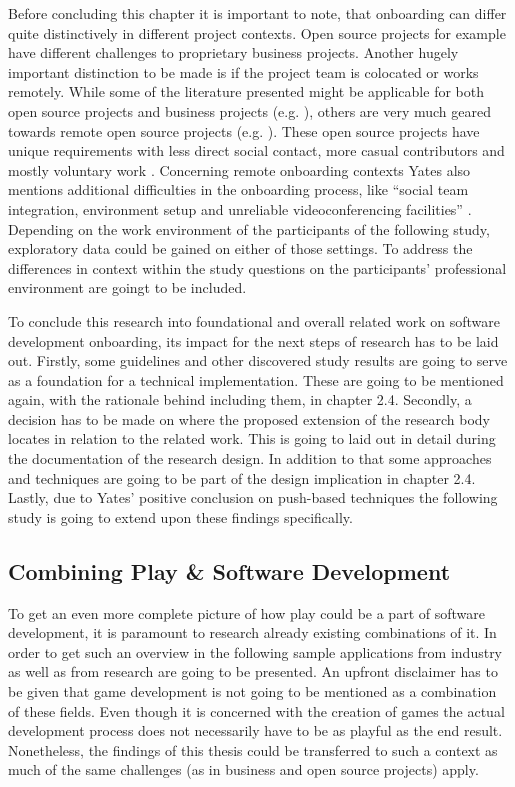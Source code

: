 Before concluding this chapter it is important to note, that onboarding can differ quite distinctively in different project contexts. Open source projects for example have different challenges to proprietary business projects. Another hugely important distinction to be made is if the project team is colocated or works remotely. While some of the literature presented might be applicable for both open source projects and business projects (e.g. \cite{dagenais2010moving}), others are very much geared towards remote open source projects (e.g. \cite{steinmacher2018let}). These open source projects have unique requirements with less direct social contact, more casual contributors and mostly voluntary work \cite{steinmacher2018let}. Concerning remote onboarding contexts Yates also mentions additional difficulties in the onboarding process, like \enquote{social team integration, environment setup and unreliable videoconferencing facilities} \cite[p. 35]{yates2014onboarding}. Depending on the work environment of the participants of the following study, exploratory data could be gained on either of those settings. To address the differences in context within the study questions on the participants' professional environment are goingt to be included.

To conclude this research into foundational and overall related work on software development onboarding, its impact for the next steps of research has to be laid out. Firstly, some guidelines and other discovered study results are going to serve as a foundation for a technical implementation. These are going to be mentioned again, with the rationale behind including them, in chapter 2.4. Secondly, a decision has to be made on where the proposed extension of the research body locates in relation to the related work. This is going to laid out in detail during the documentation of the research design. In addition to that some approaches and techniques are going to be part of the design implication in chapter 2.4. Lastly, due to Yates' positive conclusion on push-based techniques \cite[p. 197]{yates2014onboarding} the following study is going to extend upon these findings specifically.

\subsection{Combining Play \& Software Development}

To get an even more complete picture of how play could be a part of software development, it is paramount to research already existing combinations of it. In order to get such an overview in the following sample applications from industry as well as from research are going to be presented. An upfront disclaimer has to be given that game development is not going to be mentioned as a combination of these fields. Even though it is concerned with the creation of games the actual development process does not necessarily have to be as playful as the end result. Nonetheless, the findings of this thesis could be transferred to such a context as much of the same challenges (as in business and open source projects) apply.

